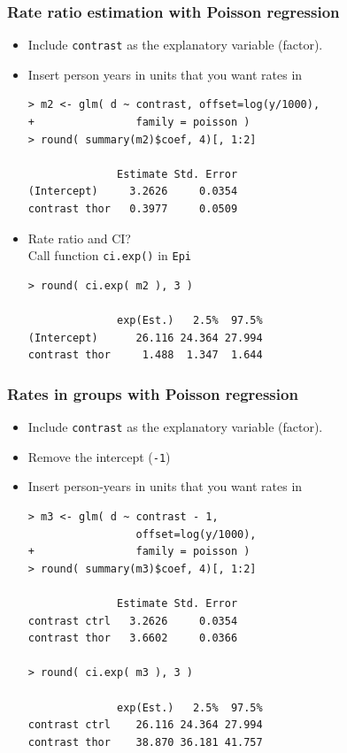 \documentclass[handout,12pt,dvipsnames,t]{beamer}
\begin{document}
\begin{frame}[fragile]
\frametitle{Rate ratio estimation with Poisson regression}
\begin{itemize}
\item Include {\tt contrast} as the explanatory variable (factor).
\item Insert person years in units that you want rates in
\lstset{basicstyle=\footnotesize}
\begin{lstlisting}
> m2 <- glm( d ~ contrast, offset=log(y/1000),
+                family = poisson )
> round( summary(m2)$coef, 4)[, 1:2]

              Estimate Std. Error
(Intercept)     3.2626     0.0354
contrast thor   0.3977     0.0509
\end{lstlisting}
\normalsize
\item Rate ratio and CI?\\
Call function {\tt ci.exp()} in {\tt Epi}
\lstset{basicstyle=\ttfamily\footnotesize}
\begin{lstlisting}
> round( ci.exp( m2 ), 3 )

              exp(Est.)   2.5%  97.5%
(Intercept)      26.116 24.364 27.994
contrast thor     1.488  1.347  1.644
\end{lstlisting}
\normalsize
\end{itemize}
\end{frame}

\begin{frame}[fragile]
\frametitle{Rates in groups with Poisson regression}

\begin{itemize} %
\item Include {\tt contrast} as the explanatory variable (factor).
\item Remove the intercept (\texttt{-1})
\item Insert person-years in units that you want rates in
\lstset{basicstyle=\ttfamily\footnotesize}
\begin{lstlisting}
> m3 <- glm( d ~ contrast - 1, 
                 offset=log(y/1000),
+                family = poisson )
> round( summary(m3)$coef, 4)[, 1:2]

              Estimate Std. Error
contrast ctrl   3.2626     0.0354
contrast thor   3.6602     0.0366

> round( ci.exp( m3 ), 3 )

              exp(Est.)   2.5%  97.5%
contrast ctrl    26.116 24.364 27.994
contrast thor    38.870 36.181 41.757
\end{lstlisting}
\normalsize
\end{itemize}
\end{frame}
\end{document}
